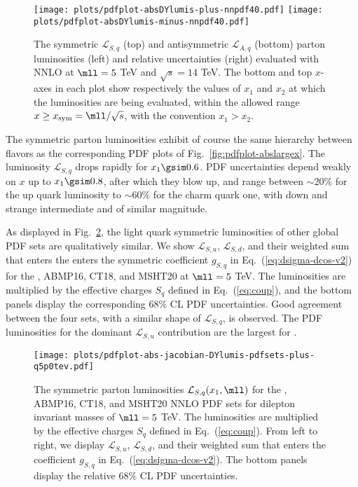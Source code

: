 \begin{figure}[!t]
 \centering
 \texttt{[image: plots/pdfplot-absDYlumis-plus-nnpdf40.pdf]}
 \texttt{[image: plots/pdfplot-absDYlumis-minus-nnpdf40.pdf]}
 \caption{The symmetric $\mathcal{L}_{S,q}$ (top)
   and antisymmetric $\mathcal{L}_{A,q}$ (bottom)
   parton
   luminosities (left) and relative uncertainties (right) evaluated with
    NNLO at $\mll=5$ TeV and $\sqrt{s}=14$ TeV.
The bottom  and top $x$-axes in each plot show respectively the values
of $x_1$ and $x_2$  at which the
luminosities are being evaluated, within the allowed range
$x \ge x_{\rm sym}=\mll/\sqrt{s}$, with the convention $x_1>x_2$.}    
 \label{fig:pdfplot-absDYlumis-plus-nnpdf40}
\end{figure}

The symmetric parton luminosities exhibit of course the same hierarchy
between flavors
as the corresponding PDF plots of Fig.~\ref{fig:pdfplot-abslargex}. 
%
The luminosity $\mathcal{L}_{S,q}$  drops rapidly for
$x_1\gsim 0.6$. PDF  uncertainties  depend weakly on  $x$
up to $x_1\gsim 0.8$, after which they blow up, and range between $\sim 20\%$
for the up quark luminosity to $\sim 60\%$ for the charm quark one,
with down and strange intermediate and of similar magnitude.

As displayed in Fig.~\ref{fig:mll_dep_lumi_plus}, the light quark symmetric luminosities of other global PDF sets
are qualitatively similar.
%
We show $\mathcal{L}_{S,u}$,  $\mathcal{L}_{S,d}$,
and their weighted sum that enters the  enters the
symmetric coefficient $g_{S,q}$ in Eq.~(\ref{eq:dsigma-dcos-v2})
for the , ABMP16,
CT18, and MSHT20 at $\mll=5$ TeV.
%
The luminosities are multiplied by the effective charges
$S_q$ defined in Eq.~(\ref{eq:coup}),
and the bottom panels display the corresponding 68\% CL PDF uncertainties.
%
Good agreement between the four sets, with a similar shape
of $\mathcal{L}_{S,q}$, is observed.
%
The PDF luminosities for the dominant $\mathcal{L}_{S,u}$ contribution are the largest for .

\begin{figure}[!t]
 \centering
 \texttt{[image: plots/pdfplot-abs-jacobian-DYlumis-pdfsets-plus-q5p0tev.pdf]}
  \caption{The symmetric 
   parton luminosities $\mathcal{L}_{S,q}(x_1,\mll)$ for the , ABMP16,
   CT18, and MSHT20 NNLO PDF sets for dilepton
   invariant masses of $\mll=5$ TeV.
   The luminosities are multiplied by the effective charges
   $S_q$ defined in Eq.~(\ref{eq:coup}).
   From left to right, we display $\mathcal{L}_{S,u}$,  $\mathcal{L}_{S,d}$,
   and their weighted sum that enters the  coefficient $g_{S,q}$ in Eq.~(\ref{eq:dsigma-dcos-v2}).
   The bottom panels display the relative 68\% CL PDF uncertainties.
    }    
 \label{fig:mll_dep_lumi_plus}
\end{figure}

